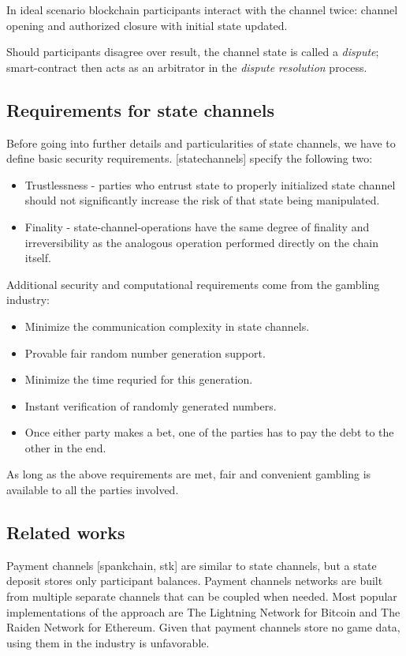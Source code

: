 	In ideal scenario blockchain participants interact with the channel twice: channel opening and authorized closure with initial state updated.

	Should participants disagree over result, the channel state is called a \textit {dispute}; smart-contract then acts as an arbitrator in the \textit {dispute resolution} process.

		\subsection {Requirements for state channels}
	Before going into further details and particularities of state channels, we have to define basic security requirements. [statechannels] specify the following two:
	\begin{itemize}
		\item Trustlessness - parties who entrust state to properly initialized state channel should not significantly increase the risk of that state being manipulated. 
		\item Finality - state-channel-operations have the same degree of finality and irreversibility as the analogous operation performed directly on the chain itself.
	\end{itemize}
	Additional security and computational requirements come from the gambling industry:
	\begin{itemize}
		\item Minimize the communication complexity in state channels.
		\item Provable fair random number generation support.
		\item Minimize the time requried for this generation.
		\item Instant verification of randomly generated numbers.
		\item Once either party makes a bet, one of the parties has to pay the debt to the other in the end. 
	\end{itemize}

	As long as the above requirements are met, fair and convenient gambling is available to all the parties involved.

		\subsection {Related works} 
	Payment channels [spankchain, stk] are similar to state channels, but a state deposit stores only participant balances. Payment channels networks are built from multiple separate channels that can be coupled when needed. Most popular implementations of the approach are The Lightning Network for Bitcoin and The Raiden Network for Ethereum. Given that payment channels store no game data, using them in the industry is unfavorable. 

